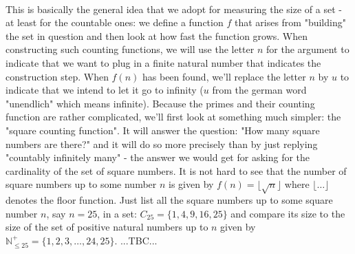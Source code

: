 \documentclass[12pt]{article}
\begin{document}
\paragraph{} This is basically the general idea that we adopt for measuring the size of a set - at least for the countable ones: we define a function $f$ that arises from "building" the set in question and then look at how fast the function grows. When constructing such counting functions, we will use the letter $n$ for the argument to indicate that we want to plug in a finite natural number that indicates the construction step. When $f(n)$ has been found, we'll replace the letter $n$ by $u$ to indicate that we intend to let it go to infinity ($u$ from the german word "unendlich" which means infinite). Because the primes and their counting function are rather complicated, we'll first look at something much simpler: the "square counting function". It will answer the question: "How many square numbers are there?" and it will do so more precisely than by just replying "countably infinitely many" - the answer we would get for asking for the cardinality of the set of square numbers. It is not hard to see that the number of square numbers up to some number $n$ is given by $f(n) = \lfloor \sqrt{n} \rfloor$ where $\lfloor \ldots \rfloor$ denotes the floor function. Just list all the square numbers up to some square number $n$, say $n=25$, in a set: $C_{25} = \{1,4,9,16,25\}$ and compare its size to the size of the set of positive natural numbers up to $n$ given by $\mathbb{N}^+_{\leq 25} = \{1,2,3,\ldots,24,25\}$. ...TBC... %
\end{document}
